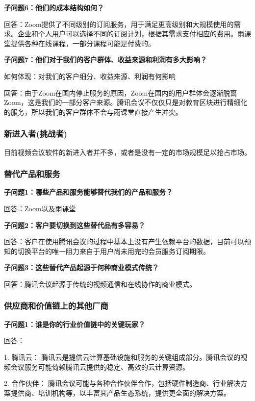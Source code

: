 \documentclass[a4paper,12pt]{article}
\begin{document}
    \textbf{子问题6：他们的成本结构如何？}

    回答：Zoom提供了不同级别的订阅服务，用于满足更高级别和大规模使用的需求。企业和个人用户可以选择不同的订阅计划，根据其需求支付相应的费用。雨课堂提供各种在线课程，一部分课程可能是付费的。
    
    \textbf{子问题7：他们对于我们的客户群体、收益来源和利润有多大影响？}

    如何体现：对我们的客户细分、收益来源、利润有何影响

    回答：由于Zoom在国内停止服务的原因，Zoom在国内的用户群体会逐渐脱离Zoom，这是我们的一部分客户来源。腾讯会议不仅仅只是对教育区块进行精细化的服务，所以我们的客户群体不会与雨课堂直接产生冲突。
    
    \subsubsection{新进入者(挑战者)}
    目前视频会议软件的新进入者并不多，或者是没有一定的市场规模足以抢占市场。
    \subsubsection{替代产品和服务}
    \textbf{子问题1：哪些产品和服务能够替代我们的产品和服务？}

    回答：Zoom以及雨课堂

    \textbf{子问题2：客户要切换到这些替代品有多容易？}

    回答：客户在使用腾讯会议的过程中基本上没有产生依赖平台的数据，目前可以预知的切换平台的唯一阻力来自于用户尚未用完的会员服务订阅期限。

    \textbf{子问题3：这些替代产品起源于何种商业模式传统？}

    回答：腾讯会议起源于传统的视频通信和在线协作的商业模式。
    
    \subsubsection{供应商和价值链上的其他厂商}
    \textbf{子问题1：谁是你的行业价值链中的关键玩家？}

    回答：
    
    1. 腾讯云： 腾讯云是提供云计算基础设施和服务的关键组成部分。腾讯会议的视频会议服务可能倚赖腾讯云提供的稳定、高效的云计算资源。

    2. 合作伙伴： 腾讯会议可能与各种合作伙伴合作，包括硬件制造商、行业解决方案提供商、培训机构等，以丰富其产品生态系统，提供更全面的解决方案。
\end{document}
